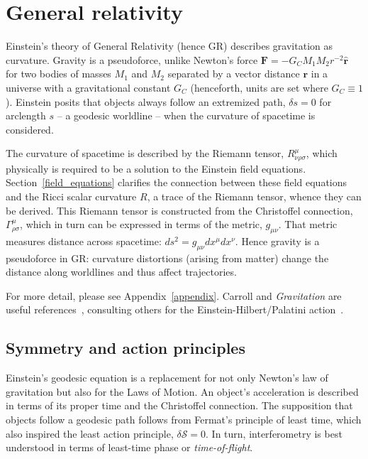     \section{General relativity}
    \label{general_relativity}

        Einstein's theory of General Relativity (hence GR) describes gravitation as curvature. 
Gravity is a pseudoforce, unlike Newton's force $\textbf{F} = -G_C M_1 M_2 r^{-2} \hat{\textbf{r}}$ for two bodies of masses $M_1$ and $M_2$ separated by a vector distance $\textbf{r}$ in a universe with a gravitational constant $G_C$ (henceforth, units are set where $G_C \equiv 1$).
 Einstein posits that objects always follow an extremized path, $\delta s = 0$ for arclength $s$  -- a geodesic worldline -- when the curvature of spacetime is considered. 

The curvature of spacetime is described by the Riemann tensor, $R^\mu_{\nu\rho\sigma}$, which physically is required to be a solution to the Einstein field equations. 
Section~\ref{field_equations} clarifies the connection between these field equations and the Ricci scalar curvature $R$, a trace of the Riemann tensor, whence they can be derived. 
This Riemann tensor is constructed from the Christoffel connection, $\Gamma^\mu_{\rho\sigma}$, which in turn can be expressed in terms of the metric, $g_{\mu \nu}$.
That metric measures distance across spacetime: $ds^2 = g_{\mu\nu} dx^\mu dx^\nu$.
Hence gravity is a pseudoforce in GR: curvature distortions (arising from matter) change the distance along worldlines and thus affect trajectories.

For more detail, please see Appendix~\ref{appendix}.
 Carroll and \textit{Gravitation} are useful references~\cite{Carroll1997,MisnerThorneWheeler}, consulting others for the Einstein-Hilbert/Palatini action~\cite{FarrThesis}.


        \subsection{Symmetry and action principles}
        \label{principles}

Einstein's geodesic equation is a replacement for not only Newton's law of gravitation but also for the Laws of Motion.
An object's acceleration is described in terms of its proper time and the Christoffel connection.
The supposition that objects follow a geodesic path follows from Fermat's principle of least time, which also inspired the least action principle, $\delta \mathcal{S} = 0$.
In turn, interferometry is best understood in terms of least-time phase or \textit{time-of-flight}.

